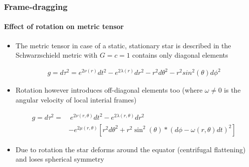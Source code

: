 \begin{frame}
\frametitle{Frame-dragging}
\framesubtitle{Effect of rotation on metric tensor}

\begin{itemize}
	\item The metric tensor in case of a static, stationary star is described in the Schwarzschield metric with $G = c = 1$ contains only diagonal elements
	\begin{block}{}
		\begin{equation} \label{eq:1}
		\begin{aligned}
			g
			=
			d \tau^{2}
			=
			e^{2 \nu \left( r \right)} dt^{2}
			-
			e^{2 \lambda \left( r \right)} dr^{2}
			-
			r^{2} d \theta^{2}
			-
			r^{2} sin^{2} \left( \theta \right) d \phi^{2}
		\end{aligned}
		\end{equation}
	\end{block}
	\item Rotation however introduces off-diagonal elements too (where $\omega \neq 0$ is the angular velocity of local interial frames)
	\begin{block}{}
		\begin{equation} \label{eq:2}
		\begin{aligned}
			g
			=
			d \tau^{2}
			=&
			\ e^{2 \nu \left( r, \theta \right)} dt^{2}
			-
			e^{2 \lambda \left( r, \theta \right)} dr^{2} 
			\\
			&-
			e^{2 \mu \left( r, \theta \right)}
			\left[
				r^{2} d \theta^{2} + r^{2} \sin^{2} \left( \theta \right)
				*
				\left(
					d \phi - \omega \left( r, \theta \right) dt
				\right)^{2}
			\right]
		\end{aligned}
		\end{equation}
	\end{block}
	\item Due to rotation the star deforms around the equator (centrifugal flattening) and loses spherical symmetry
\end{itemize}

\end{frame}